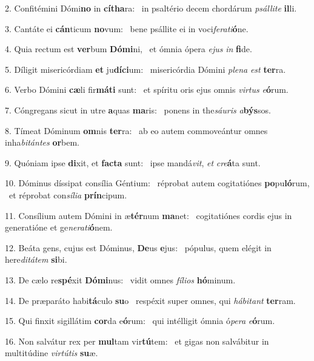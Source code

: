 2. Confitémini Dómi\textbf{no} in \textbf{cí}\textbf{tha}ra: \ast\  in psaltério decem chordárum \textit{psál}\textit{li}\textit{te} \textbf{il}li.\

3. Cantáte ei \textbf{cán}ticum \textbf{no}vum: \ast\  bene psállite ei in voci\textit{fe}\textit{ra}\textit{ti}\textbf{ó}ne.\

4. Quia rectum est \textbf{ver}bum \textbf{Dó}\textbf{mi}ni, \ast\  et ómnia ópera \textit{e}\textit{jus} \textit{in} \textbf{fi}de.\

5. Díligit misericórdiam \textbf{et} ju\textbf{dí}\textbf{ci}um: \ast\  misericórdia Dómini \textit{ple}\textit{na} \textit{est} \textbf{ter}ra.\

6. Verbo Dómini \textbf{cæ}li fir\textbf{má}\textbf{ti} sunt: \ast\  et spíritu oris ejus omnis \textit{vir}\textit{tus} \textit{e}\textbf{ó}rum.\

7. Cóngregans sicut in utre \textbf{a}quas \textbf{ma}ris: \ast\  ponens in the\textit{sáu}\textit{ris} \textit{a}\textbf{býs}sos.\

8. Tímeat Dóminum \textbf{om}nis \textbf{ter}ra: \ast\  ab eo autem commoveántur omnes inha\textit{bi}\textit{tán}\textit{tes} \textbf{or}bem.\

9. Quóniam ipse \textbf{di}xit, et \textbf{fac}\textbf{ta} sunt: \ast\  ipse mandá\textit{vit}, \textit{et} \textit{cre}\textbf{á}ta sunt.\

10. Dóminus díssipat consília Géntium: \dag\  réprobat autem cogitatiónes \textbf{po}pu\textbf{ló}rum, \ast\  et réprobat con\textit{sí}\textit{li}\textit{a} \textbf{prín}cipum.\

11. Consílium autem Dómini in æ\textbf{tér}num \textbf{ma}net: \ast\  cogitatiónes cordis ejus in generatióne et ge\textit{ne}\textit{ra}\textit{ti}\textbf{ó}nem.\

12. Beáta gens, cujus est Dóminus, \textbf{De}us \textbf{e}jus: \ast\  pópulus, quem elégit in here\textit{di}\textit{tá}\textit{tem} \textbf{si}bi.\

13. De cælo re\textbf{spé}xit \textbf{Dó}\textbf{mi}nus: \ast\  vidit omnes \textit{fí}\textit{li}\textit{os} \textbf{hó}minum.\

14. De præparáto habi\textbf{tá}culo \textbf{su}o \ast\  respéxit super omnes, qui \textit{há}\textit{bi}\textit{tant} \textbf{ter}ram.\

15. Qui finxit sigillátim \textbf{cor}da e\textbf{ó}rum: \ast\  qui intélligit ómnia ó\textit{pe}\textit{ra} \textit{e}\textbf{ó}rum.\

16. Non salvátur rex per \textbf{mul}tam vir\textbf{tú}tem: \ast\  et gigas non salvábitur in multitúdine \textit{vir}\textit{tú}\textit{tis} \textbf{su}æ.\

